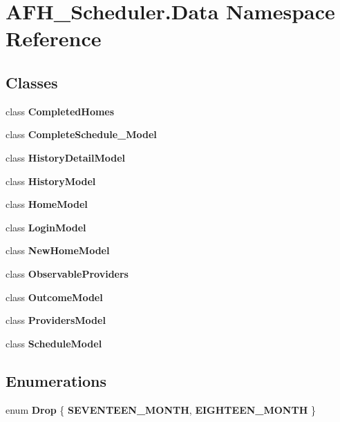 \section{A\+F\+H\+\_\+\+Scheduler.\+Data Namespace Reference}
\label{namespace_a_f_h___scheduler_1_1_data}
\subsection*{Classes}
\begin{DoxyCompactItemize}
\item 
class \textbf{ Completed\+Homes}
\item 
class \textbf{ Complete\+Schedule\+\_\+\+Model}
\item 
class \textbf{ History\+Detail\+Model}
\item 
class \textbf{ History\+Model}
\item 
class \textbf{ Home\+Model}
\item 
class \textbf{ Login\+Model}
\item 
class \textbf{ New\+Home\+Model}
\item 
class \textbf{ Observable\+Providers}
\item 
class \textbf{ Outcome\+Model}
\item 
class \textbf{ Providers\+Model}
\item 
class \textbf{ Schedule\+Model}
\end{DoxyCompactItemize}
\subsection*{Enumerations}
\begin{DoxyCompactItemize}
\item 
\mbox{\label{namespace_a_f_h___scheduler_1_1_data_a1aa3150d55d64547437bda1312faa20a}} 
enum {\bfseries Drop} \{ {\bfseries S\+E\+V\+E\+N\+T\+E\+E\+N\+\_\+\+M\+O\+N\+TH}, 
{\bfseries E\+I\+G\+H\+T\+E\+E\+N\+\_\+\+M\+O\+N\+TH}
 \}
\end{DoxyCompactItemize}
